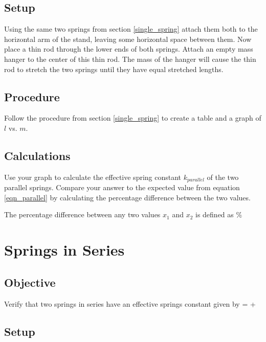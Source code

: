     \subsection*{Setup}

        Using the same two springs from section \ref{single_spring} attach them both to the horizontal arm of the stand, leaving some horizontal space between them. Now place a thin rod through the lower ends of both springs. Attach an empty mass hanger to the center of this thin rod. The mass of the hanger will cause the thin rod to stretch the two springs until they have equal stretched lengths.

    \subsection*{Procedure}

        Follow the procedure from section \ref{single_spring} to create a table and a graph of $l$ vs. $m$.

    \subsection*{Calculations}

        Use your graph to calculate the effective spring constant $k_{parallel}$ of the two parallel springs. Compare your answer to the expected value from equation \eqref{eqn_parallel} by calculating the percentage difference between the two values.

        The percentage difference between any two values $x_1$ and $x_2$ is defined as
        \beq \label{percentage_difference}
              \%
        \eeq


\section{Springs in Series}

    \subsection*{Objective}

        Verify that two springs in series have an effective springs constant given by
        \beq \label{series}
             =  + 
        \eeq

    \subsection*{Setup}

